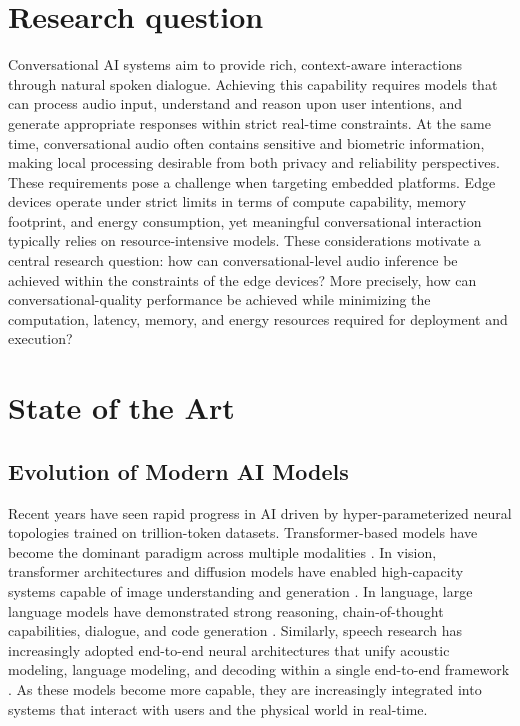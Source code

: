 \documentclass[conference]{IEEEtran}
\begin{document}
\section{Research question} \label{sec:research_question}
Conversational AI systems aim to provide rich, context-aware interactions through natural spoken dialogue. Achieving this capability requires models that can process audio input, understand and reason upon user intentions, and generate appropriate responses within strict real-time constraints. At the same time, conversational audio often contains sensitive and biometric information, making local processing desirable from both privacy and reliability perspectives.
These requirements pose a challenge when targeting embedded platforms. Edge devices operate under strict limits in terms of compute capability, memory footprint, and energy consumption, yet meaningful conversational interaction typically relies on resource-intensive models.
These considerations motivate a central research question: how can conversational-level audio inference be achieved within the constraints of the edge devices? 
More precisely, how can conversational-quality performance be achieved while minimizing the computation, latency, memory, and energy resources required for deployment and execution?

\section{State of the Art} \label{sec:sota}

\subsection{Evolution of Modern AI Models}
Recent years have seen rapid progress in AI driven by hyper-parameterized neural topologies trained on trillion-token datasets. Transformer-based models have become the dominant paradigm across multiple modalities \cite{10433480}.
In vision, transformer architectures and diffusion models have enabled high-capacity systems capable of image understanding and generation \cite{10902142}. In language, large language models have demonstrated strong reasoning, chain-of-thought capabilities, dialogue, and code generation \cite{10.1145-3747588}. Similarly, speech research has increasingly adopted end-to-end neural architectures that unify acoustic modeling, language modeling, and decoding within a single end-to-end framework \cite{app142411583}.
As these models become more capable, they are increasingly integrated into systems that interact with users and the physical world in real-time. 
\end{document}
